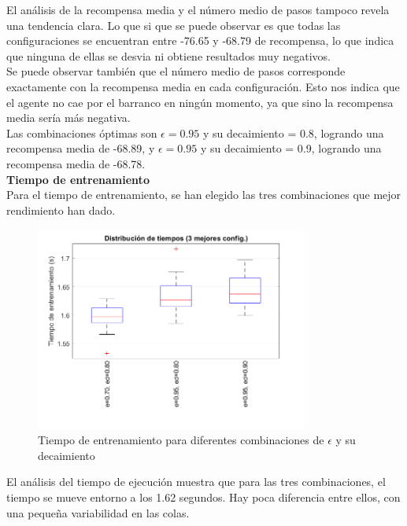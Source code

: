 El análisis de la recompensa media y el número medio de pasos tampoco revela una tendencia clara. Lo que si que se puede observar es que todas las configuraciones se encuentran entre -76.65 y -68.79 de recompensa, lo que indica que ninguna de ellas se desvia ni obtiene resultados muy negativos. 
\\

Se puede observar también que el número medio de pasos corresponde exactamente con la recompensa media en cada configuración. Esto nos indica que el agente no cae por el barranco en ningún momento, ya que sino la recompensa media sería más negativa.
\\

Las combinaciones óptimas son $\epsilon = 0.95$ y su decaimiento = 0.8, logrando una recompensa media de -68.89, y $\epsilon = 0.95$ y su decaimiento = 0.9, logrando una recompensa media de -68.78.
\\

\textbf{Tiempo de entrenamiento}
\\

Para el tiempo de entrenamiento, se han elegido las tres combinaciones que mejor rendimiento han dado. 

\begin{figure}[H]
    \centering
    \includegraphics[width=0.8\textwidth]{../../experiments/qlearning/experiment-2/results/time.png}
    \caption{Tiempo de entrenamiento para diferentes combinaciones de $\epsilon$ y su decaimiento}
    \label{fig:qlearning-time}
\end{figure}

El análisis del tiempo de ejecución muestra que para las tres combinaciones, el tiempo se mueve entorno a los 1.62 segundos. Hay poca diferencia entre ellos, con una pequeña variabilidad en las colas. 
\\

